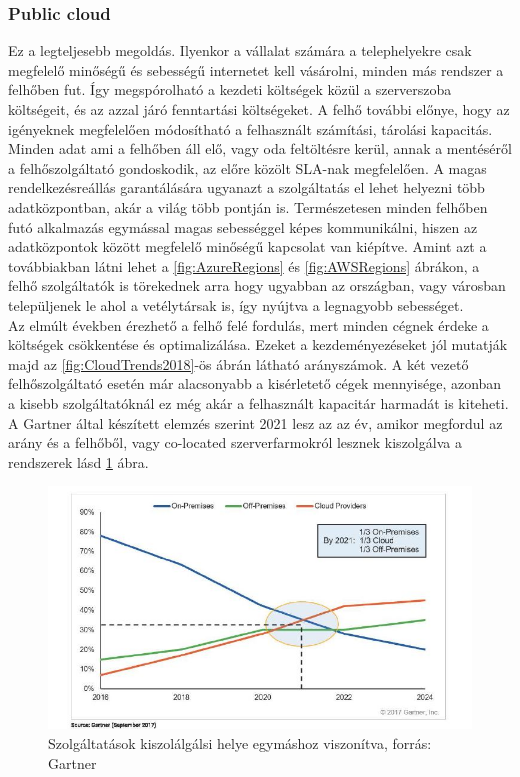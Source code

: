 \documentclass[12pt,oneside,justify,table]{book}
\begin{document}
\subsubsection{Public cloud}
Ez a legteljesebb megoldás. Ilyenkor a vállalat számára a telephelyekre csak megfelelő minőségű és sebességű internetet kell vásárolni, minden más rendszer a felhőben fut. Így megspórolható a kezdeti költségek közül a szerverszoba költségeit, és az azzal járó fenntartási költségeket. A felhő további előnye, hogy az igényeknek megfelelően módosítható a felhasznált számítási, tárolási kapacitás. Minden adat ami a felhőben áll elő, vagy oda feltöltésre kerül, annak a mentéséről a felhőszolgáltató gondoskodik, az előre közölt SLA-nak megfelelően. A magas rendelkezésreállás garantálására ugyanazt a szolgáltatás el lehet helyezni több adatközpontban, akár a világ több pontján is. Természetesen minden felhőben futó alkalmazás egymással magas sebességgel képes kommunikálni, hiszen az adatközpontok között megfelelő minőségű kapcsolat van kiépítve. Amint azt a továbbiakban látni lehet a \ref{fig:AzureRegions} és \ref{fig:AWSRegions} ábrákon, a felhő szolgáltatók is törekednek arra hogy ugyabban az országban, vagy városban települjenek le ahol a vetélytársak is, így nyújtva a legnagyobb sebességet. \\

Az elmúlt években érezhető a felhő felé fordulás, mert minden cégnek érdeke a költségek csökkentése és optimalizálása. Ezeket a kezdeményezéseket jól mutatják majd az \ref{fig:CloudTrends2018}-ös ábrán látható arányszámok. A két vezető felhőszolgáltató esetén már alacsonyabb a kisérletető cégek mennyisége, azonban a kisebb szolgáltatóknál ez még akár a felhasznált kapacitár harmadát is kiteheti. A Gartner által készített elemzés szerint 2021 lesz az az év, amikor megfordul az arány és a felhőből, vagy co-located szerverfarmokról lesznek kiszolgálva a rendszerek lásd \ref{fig:trends_gartner} ábra. 
\begin{figure}[H]
\centering
\includegraphics[width=1\textwidth]{trends_gartner.jpg}
\caption{Szolgáltatások kiszolálgálsi helye egymáshoz viszonítva, forrás: Gartner \cite{Gartner}}
\label{fig:trends_gartner}
\end{figure}
\end{document}
